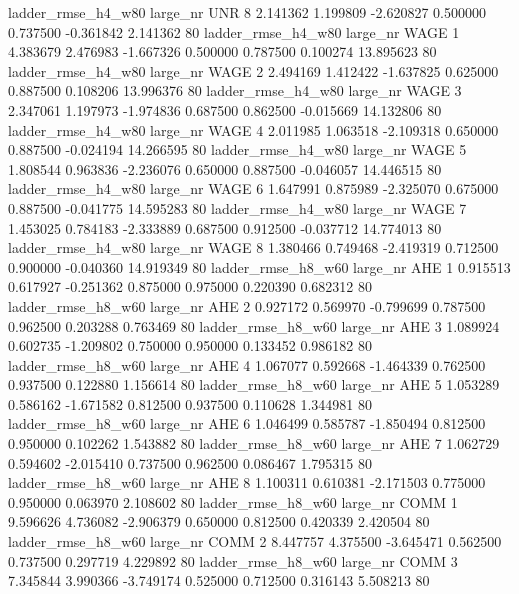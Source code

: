  ladder_rmse_h4_w80   large_nr      UNR                 8  2.141362  1.199809  -2.620827 0.500000 0.737500 -0.361842    2.141362 80
 ladder_rmse_h4_w80   large_nr     WAGE                 1  4.383679  2.476983  -1.667326 0.500000 0.787500  0.100274   13.895623 80
 ladder_rmse_h4_w80   large_nr     WAGE                 2  2.494169  1.412422  -1.637825 0.625000 0.887500  0.108206   13.996376 80
 ladder_rmse_h4_w80   large_nr     WAGE                 3  2.347061  1.197973  -1.974836 0.687500 0.862500 -0.015669   14.132806 80
 ladder_rmse_h4_w80   large_nr     WAGE                 4  2.011985  1.063518  -2.109318 0.650000 0.887500 -0.024194   14.266595 80
 ladder_rmse_h4_w80   large_nr     WAGE                 5  1.808544  0.963836  -2.236076 0.650000 0.887500 -0.046057   14.446515 80
 ladder_rmse_h4_w80   large_nr     WAGE                 6  1.647991  0.875989  -2.325070 0.675000 0.887500 -0.041775   14.595283 80
 ladder_rmse_h4_w80   large_nr     WAGE                 7  1.453025  0.784183  -2.333889 0.687500 0.912500 -0.037712   14.774013 80
 ladder_rmse_h4_w80   large_nr     WAGE                 8  1.380466  0.749468  -2.419319 0.712500 0.900000 -0.040360   14.919349 80
 ladder_rmse_h8_w60   large_nr      AHE                 1  0.915513  0.617927  -0.251362 0.875000 0.975000  0.220390    0.682312 80
 ladder_rmse_h8_w60   large_nr      AHE                 2  0.927172  0.569970  -0.799699 0.787500 0.962500  0.203288    0.763469 80
 ladder_rmse_h8_w60   large_nr      AHE                 3  1.089924  0.602735  -1.209802 0.750000 0.950000  0.133452    0.986182 80
 ladder_rmse_h8_w60   large_nr      AHE                 4  1.067077  0.592668  -1.464339 0.762500 0.937500  0.122880    1.156614 80
 ladder_rmse_h8_w60   large_nr      AHE                 5  1.053289  0.586162  -1.671582 0.812500 0.937500  0.110628    1.344981 80
 ladder_rmse_h8_w60   large_nr      AHE                 6  1.046499  0.585787  -1.850494 0.812500 0.950000  0.102262    1.543882 80
 ladder_rmse_h8_w60   large_nr      AHE                 7  1.062729  0.594602  -2.015410 0.737500 0.962500  0.086467    1.795315 80
 ladder_rmse_h8_w60   large_nr      AHE                 8  1.100311  0.610381  -2.171503 0.775000 0.950000  0.063970    2.108602 80
 ladder_rmse_h8_w60   large_nr     COMM                 1  9.596626  4.736082  -2.906379 0.650000 0.812500  0.420339    2.420504 80
 ladder_rmse_h8_w60   large_nr     COMM                 2  8.447757  4.375500  -3.645471 0.562500 0.737500  0.297719    4.229892 80
 ladder_rmse_h8_w60   large_nr     COMM                 3  7.345844  3.990366  -3.749174 0.525000 0.712500  0.316143    5.508213 80

